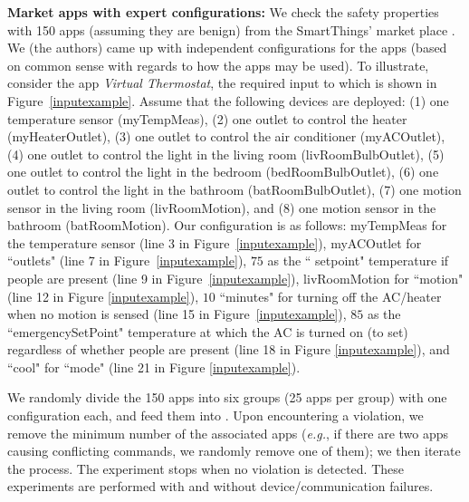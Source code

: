 {\bf Market apps with expert configurations:}
We check the safety properties with
150 apps (assuming they are benign) from the {\color{black}SmartThings' market place \cite{SmartThingsGitHub,STCommunitySmartApps,Samsung:smartthingsmanage}.}
We (the authors) came up with independent
configurations for the apps (based on common sense with regards to how the apps may be used).
To illustrate, consider the app \textsl{Virtual Thermostat}, the required input to which is shown in Figure~\ref{inputexample}.
Assume that the following devices are deployed:
(1) one temperature sensor (myTempMeas), (2) one outlet to control the heater (myHeaterOutlet),
(3) one outlet to control the air conditioner (myACOutlet),
(4) one outlet to control the light in the living room (livRoomBulbOutlet),
(5) one outlet to control the light in the bedroom (bedRoomBulbOutlet),
(6) one outlet to control the light in the bathroom (batRoomBulbOutlet),
(7) one motion sensor in the living room (livRoomMotion),
and (8) one motion sensor in the bathroom (batRoomMotion).
Our configuration is as follows:
myTempMeas for the temperature sensor (line 3 in Figure~\ref{inputexample}),
myACOutlet for ``outlets" (line 7 in Figure~\ref{inputexample}),
$75$ as the ``{\color{black} setpoint}" temperature if people are present (line 9 in Figure~\ref{inputexample}),
livRoomMotion for ``motion" (line 12 in Figure \ref{inputexample}),
$10$ ``minutes" for turning off the AC/heater when no motion is sensed (line 15 in Figure~\ref{inputexample}),
$85$ as the ``emergencySetPoint" temperature at which the AC is turned on (to set) regardless of
whether people are present (line 18 in Figure \ref{inputexample}),
and ``cool" for ``mode" (line 21 in Figure \ref{inputexample}).

We randomly divide the 150 apps into six groups (25 apps per group) with one configuration each,
and feed them into \sys.
Upon encountering a violation, we remove the minimum number of the associated apps (\textit{e.g.}, if there are two apps causing conflicting commands, we randomly remove one of them);
we then iterate the process. The experiment stops when no violation is detected.
These experiments are performed with and without device/communication failures.

